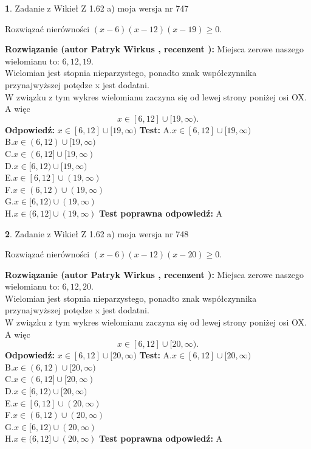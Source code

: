 \documentclass[12pt, a4paper]{article}
\theoremstyle{definition} %
\newtheorem{zad}{}
\newcommand{\zadStart}[1]{\begin{zad}#1\newline}
\newcommand{\zadStop}{\end{zad}}
\newcommand{\rozwStart}[2]{\noindent \textbf{Rozwiązanie (autor #1 , recenzent #2): }\newline}
\newcommand{\rozwStop}{\newline}
\newcommand{\odpStart}{\noindent \textbf{Odpowiedź:}\newline}
\newcommand{\odpStop}{\newline}
\newcommand{\testStart}{\noindent \textbf{Test:}\newline}
\newcommand{\testStop}{\newline}
\newcommand{\kluczStart}{\noindent \textbf{Test poprawna odpowiedź:}\newline}
\newcommand{\kluczStop}{\newline}
\begin{document}
\zadStart{Zadanie z Wikieł Z 1.62 a) moja wersja nr 747}

Rozwiązać nierówności $(x-6)(x-12)(x-19)\ge0$.
\zadStop
\rozwStart{Patryk Wirkus}{}
Miejsca zerowe naszego wielomianu to: $6, 12, 19$.\\
Wielomian jest stopnia nieparzystego, ponadto znak współczynnika przy\linebreak najwyższej potędze x jest dodatni.\\ W związku z tym wykres wielomianu zaczyna się od lewej strony poniżej osi OX. A więc $$x \in [6,12] \cup [19,\infty).$$
\rozwStop
\odpStart
$x \in [6,12] \cup [19,\infty)$
\odpStop
\testStart
A.$x \in [6,12] \cup [19,\infty)$\\
B.$x \in (6,12) \cup [19,\infty)$\\
C.$x \in (6,12] \cup [19,\infty)$\\
D.$x \in [6,12) \cup [19,\infty)$\\
E.$x \in [6,12] \cup (19,\infty)$\\
F.$x \in (6,12) \cup (19,\infty)$\\
G.$x \in [6,12) \cup (19,\infty)$\\
H.$x \in (6,12] \cup (19,\infty)$
\testStop
\kluczStart
A
\kluczStop



\zadStart{Zadanie z Wikieł Z 1.62 a) moja wersja nr 748}

Rozwiązać nierówności $(x-6)(x-12)(x-20)\ge0$.
\zadStop
\rozwStart{Patryk Wirkus}{}
Miejsca zerowe naszego wielomianu to: $6, 12, 20$.\\
Wielomian jest stopnia nieparzystego, ponadto znak współczynnika przy\linebreak najwyższej potędze x jest dodatni.\\ W związku z tym wykres wielomianu zaczyna się od lewej strony poniżej osi OX. A więc $$x \in [6,12] \cup [20,\infty).$$
\rozwStop
\odpStart
$x \in [6,12] \cup [20,\infty)$
\odpStop
\testStart
A.$x \in [6,12] \cup [20,\infty)$\\
B.$x \in (6,12) \cup [20,\infty)$\\
C.$x \in (6,12] \cup [20,\infty)$\\
D.$x \in [6,12) \cup [20,\infty)$\\
E.$x \in [6,12] \cup (20,\infty)$\\
F.$x \in (6,12) \cup (20,\infty)$\\
G.$x \in [6,12) \cup (20,\infty)$\\
H.$x \in (6,12] \cup (20,\infty)$
\testStop
\kluczStart
A
\kluczStop
\end{document}
